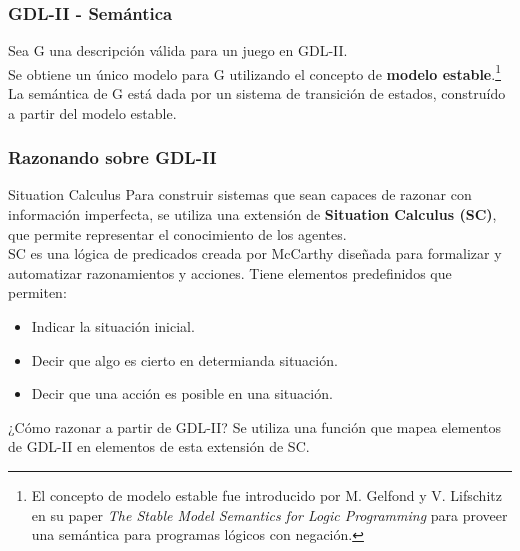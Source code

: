 \documentclass{beamer}
\begin{document}
\begin{frame}
\frametitle{GDL-II - Semántica}

Sea G una descripción válida para un juego en GDL-II.\\ 
Se obtiene un único modelo para G utilizando el concepto de {\bf modelo estable}.\footnote{El concepto de modelo estable fue introducido por M. Gelfond y V. Lifschitz en su paper {\it The Stable Model Semantics for Logic Programming} para proveer una semántica para programas lógicos con negación.}\\
\vspace{10pt}
La semántica de G está dada por un sistema de transición de estados, construído a partir del modelo estable.

\end{frame}


\begin{frame}
\frametitle{Razonando sobre GDL-II}

\begin{block}{Situation Calculus}
Para construir sistemas que sean capaces de razonar con información imperfecta, se utiliza una extensión de {\bf Situation Calculus (SC)}, que permite representar el conocimiento de los agentes.\\

\vspace{10pt}
SC es una lógica de predicados creada por McCarthy diseñada para formalizar y automatizar razonamientos y acciones. Tiene elementos predefinidos que permiten:

\begin{itemize}
\item Indicar la situación inicial.
\item Decir que algo es cierto en determianda situación.
\item Decir que una acción es posible en una situación.
\end{itemize}

\end{block}

\begin{block}{¿Cómo razonar a partir de GDL-II?}
Se utiliza una función que mapea elementos de GDL-II en elementos de esta extensión de SC. 
\end{block}


\end{frame}
\end{document}
